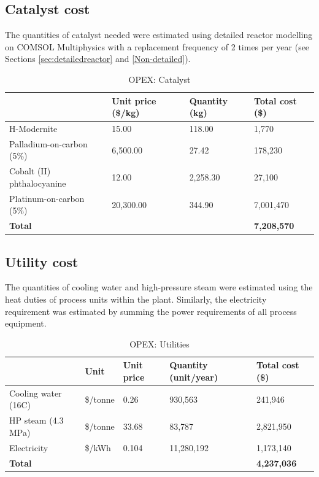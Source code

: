 \subsection{Catalyst cost}
 The quantities of catalyst needed were estimated using detailed reactor modelling on COMSOL Multiphysics with a replacement frequency of 2 times per year (see Sections \ref{sec:detailedreactor} and \ref{Non-detailed}).

\begin{table}[H]
\centering
\caption{OPEX: Catalyst}
\label{tab:opex-catalyst}
\begin{tabular}{@{}llll@{}}
\toprule
\textbf{}                  & \textbf{Unit price (\$/kg)} & \textbf{Quantity (kg)} & \textbf{Total cost (\$)} \\ \midrule
H-Modernite                & 15.00                       & 118.00                 & 1,770                    \\
Palladium-on-carbon (5\%)  & 6,500.00                    & 27.42                  & 178,230                  \\
Cobalt (II) phthalocyanine & 12.00                       & 2,258.30               & 27,100                   \\
Platinum-on-carbon (5\%)   & 20,300.00                   & 344.90                 & 7,001,470                \\ 
\textbf{Total}             &                             &                        & \textbf{7,208,570}  \\\bottomrule    
\end{tabular}
\end{table}

\subsection{Utility cost}
 The quantities of cooling water and high-pressure steam were estimated using the heat duties of process units within the plant. Similarly, the electricity requirement was estimated by summing the power requirements of all process equipment.
 \begin{table}[H]
\centering
\caption{OPEX: Utilities}
\label{tab:opex-utilities}
\begin{tabular}{@{}lllll@{}}
\toprule
\textbf{}            & \textbf{Unit} & \textbf{Unit price} & \textbf{Quantity (unit/year)} & \textbf{Total cost (\$)} \\\midrule
Cooling water  (16C) & \$/tonne      & 0.26                & 930,563                       & 241,946                  \\
HP steam (4.3 MPa)   & \$/tonne      & 33.68               & 83,787                        & 2,821,950                \\
Electricity          & \$/kWh        & 0.104               & 11,280,192                    & 1,173,140                \\
\textbf{Total}       & \textbf{}     & \textbf{}           & \textbf{}                     & \textbf{4,237,036}      \\\bottomrule
\end{tabular}
\end{table}

